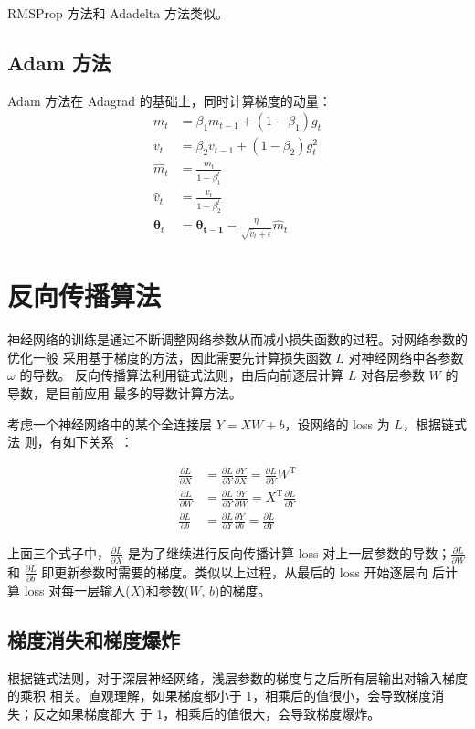 RMSProp 方法和 Adadelta 方法类似。

\subsection{Adam 方法}
Adam 方法在 Adagrad 的基础上，同时计算梯度的动量：
\begin{align}
  m_t & = \beta_1 m_{t-1} + (1-\beta_1) g_t \\
  v_t & = \beta_2 v_{t-1} + (1-\beta_2) g_t^2 \\
  \hat{m}_t & = \frac{m_t}{1-\beta_1^t} \\
  \hat{v}_t & = \frac{v_t}{1-\beta_2^t} \\
  \boldsymbol{\theta}_{t} & = \boldsymbol{\theta_{t-1}} - \frac{\eta}{\sqrt{\hat{v}_t + \epsilon}}\hat{m}_t
\end{align}

\section{反向传播算法}
神经网络的训练是通过不断调整网络参数从而减小损失函数的过程。对网络参数的优化一般
采用基于梯度的方法，因此需要先计算损失函数 $L$ 对神经网络中各参数 $\omega$ 的导数。
反向传播算法利用链式法则，由后向前逐层计算 $L$ 对各层参数 $W$ 的导数，是目前应用
最多的导数计算方法。

考虑一个神经网络中的某个全连接层 $Y = XW + b$，设网络的 loss 为 $L$，根据链式法
则，有如下关系~：

\begin{align}
  \label{equ:bp-fc}
  \frac{\partial L}{\partial X} & = \frac{\partial L}{\partial Y} \frac{\partial Y}{\partial X} = \frac{\partial L}{\partial Y} W^{\mathrm{T}} \\
  \frac{\partial L}{\partial W} & = \frac{\partial L}{\partial Y} \frac{\partial Y}{\partial W} = X^{\mathrm{T}} \frac{\partial L}{\partial Y}\\
  \frac{\partial L}{\partial b} & = \frac{\partial L}{\partial Y} \frac{\partial Y}{\partial b} = \frac{\partial L}{\partial Y}
\end{align}

上面三个式子中，$\frac{\partial L}{\partial X}$ 是为了继续进行反向传播计算 loss
对上一层参数的导数；$\frac{\partial L}{\partial W}$ 和 $\frac{\partial
  L}{\partial b}$ 即更新参数时需要的梯度。类似以上过程，从最后的 loss 开始逐层向
后计算 loss 对每一层输入($X$)和参数($W, \, b$)的梯度。

\subsection{梯度消失和梯度爆炸}
\label{subsec:gradient-vanish-explosion}
根据链式法则，对于深层神经网络，浅层参数的梯度与之后所有层输出对输入梯度的乘积
相关。直观理解，如果梯度都小于 1，相乘后的值很小，会导致梯度消失；反之如果梯度都大
于 1，相乘后的值很大，会导致梯度爆炸。

